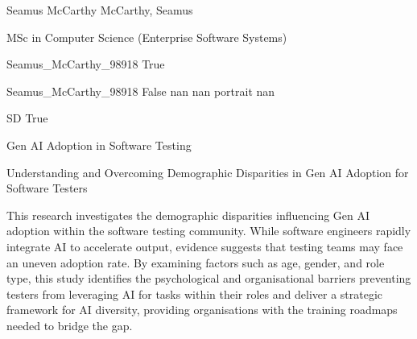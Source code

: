 
\begingroup{}\relax



\def\Key{Seamus_McCarthy_98918}

{Seamus McCarthy}
{McCarthy, Seamus}

{MSc in Computer Science (Enterprise Software Systems)}

{Seamus_McCarthy_98918}
{True}

{Seamus_McCarthy_98918}
{False}
{nan}
{nan}
{portrait}
{nan}

{SD}
{True}

{Gen AI Adoption in Software Testing}

{Understanding and Overcoming Demographic Disparities in Gen AI Adoption for Software Testers}

{This research investigates the demographic disparities influencing Gen AI adoption within the software testing community. While software engineers rapidly integrate AI to accelerate output, evidence suggests that testing teams may face an uneven adoption rate. By examining factors such as age, gender, and role type, this study identifies the psychological and organisational barriers preventing testers from leveraging AI for tasks within their roles and deliver a strategic framework for AI diversity, providing organisations with the training roadmaps needed to bridge the gap.}

